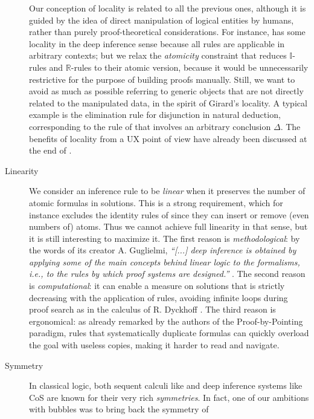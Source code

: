 \begin{description}
    Our conception of locality is related to all the previous ones, although it
    is guided by the idea of direct manipulation of logical entities by humans,
    rather than purely proof-theoretical considerations. For instance, 
    has some locality in the deep inference sense because all rules are
    applicable in arbitrary contexts; but we relax the \emph{atomicity}
    constraint that reduces $\mathbb{I}$-rules and $\mathbb{R}$-rules to their
    atomic version, because it would be unnecessarily restrictive for the
    purpose of building proofs manually. Still, we want to avoid as much as
    possible referring to generic objects that are not directly related to the
    manipulated data, in the spirit of Girard's locality. A typical example is
    the elimination rule for disjunction in natural deduction, corresponding to
    the {\rnmsf{{\lor}{-}}} rule of  that involves an arbitrary
    conclusion $\Delta$. The benefits of locality from a UX point of view have
    already been discussed at the end of .
  \item[Linearity] 
    We consider an inference rule to be \emph{linear} when it preserves the
    number of atomic formulas in solutions. This is a strong requirement, which
    for instance excludes the identity rules of  since they can insert
    or remove (even numbers of) atoms. Thus we cannot achieve full linearity in
    that sense, but it is still interesting to maximize it. The first reason is
    \emph{methodological}: by the words of its creator A. Guglielmi,
    \textit{``[...] deep inference is obtained by applying some of the main
    concepts behind linear logic to the formalisms, i.e., to the rules by which
    proof systems are designed.''} . The second reason
    is \emph{computational}: it can enable a measure on solutions that is
    strictly decreasing with the application of rules, avoiding infinite loops
    during proof search as in the calculus  of R. Dyckhoff
    \cite{dyckhoff_contraction-free_1992}. The third reason is ergonomical: as
    already remarked by the authors of the Proof-by-Pointing
    paradigm, rules that systematically
    duplicate formulas can quickly overload the goal with useless copies, making
    it harder to read and navigate.
  \item[Symmetry] 
    In classical logic, both sequent calculi like  and deep inference
    systems like CoS are known for their very rich \emph{symmetries}. In fact,
    one of our ambitions with bubbles was to bring back the symmetry of

\end{description}
